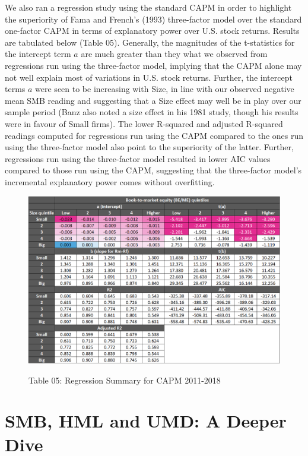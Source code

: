 \documentclass[12pt]{article}
\begin{document}
\noindent We also ran a regression study using the standard CAPM in order to highlight the superiority of Fama and French's (1993) three-factor model over the standard one-factor CAPM in terms of explanatory power over U.S. stock returns. Results are tabulated below (Table 05). Generally, the magnitudes of the t-statistics for the intercept term $a$ are much greater than they what we observed from regressions run using the three-factor model, implying that the CAPM alone may not well explain most of variations in U.S. stock returns. Further, the intercept terms $a$ were seen to be increasing with Size, in line with our observed negative mean SMB reading and suggesting that a Size effect may well be in play over our sample period (Banz also noted a size effect in his 1981 study, though his results were in favour of Small firms). The lower R-squared and adjusted R-squared readings computed for regressions run using the CAPM compared to the ones run using the three-factor model also point to the superiority of the latter. Further, regressions run using the three-factor model resulted in lower AIC values compared to those run using the CAPM, suggesting that the three-factor model's incremental explanatory power comes without overfitting.

\begin{figure}[h]
	\centering
	\caption*{Table 05: Regression Summary for CAPM 2011-2018}
	\includegraphics[width=0.9\linewidth]{A6.png}
	\label{fig:label}
\end{figure}

\newpage

\section{SMB, HML and UMD: A Deeper Dive}
\end{document}
